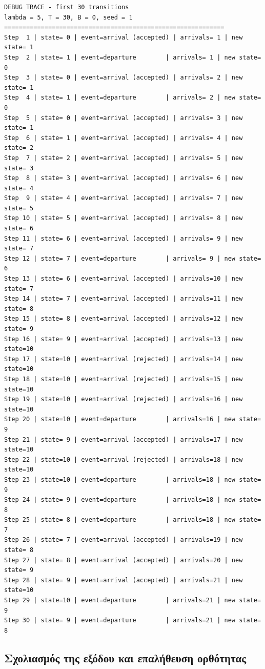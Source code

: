 \documentclass{article}
\begin{document}
{
\begin{verbatim}
DEBUG TRACE - first 30 transitions
lambda = 5, T = 30, B = 0, seed = 1
============================================================
Step  1 | state= 0 | event=arrival (accepted) | arrivals= 1 | new state= 1
Step  2 | state= 1 | event=departure        | arrivals= 1 | new state= 0
Step  3 | state= 0 | event=arrival (accepted) | arrivals= 2 | new state= 1
Step  4 | state= 1 | event=departure        | arrivals= 2 | new state= 0
Step  5 | state= 0 | event=arrival (accepted) | arrivals= 3 | new state= 1
Step  6 | state= 1 | event=arrival (accepted) | arrivals= 4 | new state= 2
Step  7 | state= 2 | event=arrival (accepted) | arrivals= 5 | new state= 3
Step  8 | state= 3 | event=arrival (accepted) | arrivals= 6 | new state= 4
Step  9 | state= 4 | event=arrival (accepted) | arrivals= 7 | new state= 5
Step 10 | state= 5 | event=arrival (accepted) | arrivals= 8 | new state= 6
Step 11 | state= 6 | event=arrival (accepted) | arrivals= 9 | new state= 7
Step 12 | state= 7 | event=departure        | arrivals= 9 | new state= 6
Step 13 | state= 6 | event=arrival (accepted) | arrivals=10 | new state= 7
Step 14 | state= 7 | event=arrival (accepted) | arrivals=11 | new state= 8
Step 15 | state= 8 | event=arrival (accepted) | arrivals=12 | new state= 9
Step 16 | state= 9 | event=arrival (accepted) | arrivals=13 | new state=10
Step 17 | state=10 | event=arrival (rejected) | arrivals=14 | new state=10
Step 18 | state=10 | event=arrival (rejected) | arrivals=15 | new state=10
Step 19 | state=10 | event=arrival (rejected) | arrivals=16 | new state=10
Step 20 | state=10 | event=departure        | arrivals=16 | new state= 9
Step 21 | state= 9 | event=arrival (accepted) | arrivals=17 | new state=10
Step 22 | state=10 | event=arrival (rejected) | arrivals=18 | new state=10
Step 23 | state=10 | event=departure        | arrivals=18 | new state= 9
Step 24 | state= 9 | event=departure        | arrivals=18 | new state= 8
Step 25 | state= 8 | event=departure        | arrivals=18 | new state= 7
Step 26 | state= 7 | event=arrival (accepted) | arrivals=19 | new state= 8
Step 27 | state= 8 | event=arrival (accepted) | arrivals=20 | new state= 9
Step 28 | state= 9 | event=arrival (accepted) | arrivals=21 | new state=10
Step 29 | state=10 | event=departure        | arrivals=21 | new state= 9
Step 30 | state= 9 | event=departure        | arrivals=21 | new state= 8
\end{verbatim}
}

\subsection{Σχολιασμός της εξόδου και επαλήθευση ορθότητας}
\end{document}

